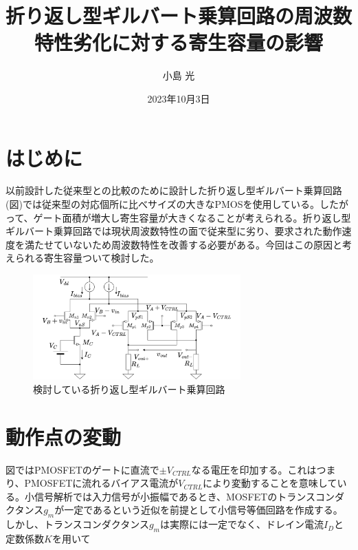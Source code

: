 \documentclass[twocolumn]{jsarticle}
\begin{document}
\title{折り返し型ギルバート乗算回路の周波数特性劣化に対する寄生容量の影響}
\author{小島 光}
\date{2023年10月3日}
\maketitle

\section{はじめに}
以前設計した従来型との比較のために設計した折り返し型ギルバート乗算回路(図)では従来型の対応個所に比べサイズの大きなPMOSを使用している。したがって、ゲート面積が増大し寄生容量が大きくなることが考えられる。折り返し型ギルバート乗算回路では現状周波数特性の面で従来型に劣り、要求された動作速度を満たせていないため周波数特性を改善する必要がある。今回はこの原因と考えられる寄生容量ついて検討した。

\begin{figure}[h]
    \begin{center}
        \includegraphics*[width=80mm]{figures/folded_gilbert.png}
        \caption{検討している折り返し型ギルバート乗算回路}
        \label{fig:folded_gilbert}
    \end{center}
\end{figure}

\section{動作点の変動}

図ではPMOSFETのゲートに直流で$\pm V_{CTRL}$なる電圧を印加する。これはつまり、PMOSFETに流れるバイアス電流が$V_{CTRL}$により変動することを意味している。小信号解析では入力信号が小振幅であるとき、MOSFETのトランスコンダクタンス$g_{m}$が一定であるという近似を前提として小信号等価回路を作成する。しかし、トランスコンダクタンス$g_{m}$は実際には一定でなく、ドレイン電流$I_{D}$と定数係数$K$を用いて
\end{document}
